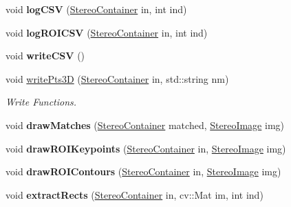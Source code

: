 \begin{DoxyCompactItemize}
\item 
void {\bfseries log\+C\+SV} (\hyperlink{structStereoContainer}{Stereo\+Container} in, int ind)\hypertarget{classStereoOps_a4af634e833f131f0416cb4e4b1c63b5c}{}\label{classStereoOps_a4af634e833f131f0416cb4e4b1c63b5c}

\item 
void {\bfseries log\+R\+O\+I\+C\+SV} (\hyperlink{structStereoContainer}{Stereo\+Container} in, int ind)\hypertarget{classStereoOps_a45ca1bf3096dfecb1b5cc41b7ddc69ca}{}\label{classStereoOps_a45ca1bf3096dfecb1b5cc41b7ddc69ca}

\item 
void {\bfseries write\+C\+SV} ()\hypertarget{classStereoOps_ae6bc70c116ecf440ba0796fdb999cd87}{}\label{classStereoOps_ae6bc70c116ecf440ba0796fdb999cd87}

\item 
void \hyperlink{classStereoOps_a8631d41ba48d3e808010643d6cb74f57}{write\+Pts3D} (\hyperlink{structStereoContainer}{Stereo\+Container} in, std\+::string nm)\hypertarget{classStereoOps_a8631d41ba48d3e808010643d6cb74f57}{}\label{classStereoOps_a8631d41ba48d3e808010643d6cb74f57}

\begin{DoxyCompactList}\small\item\em Write Functions. \end{DoxyCompactList}\item 
void {\bfseries draw\+Matches} (\hyperlink{structStereoContainer}{Stereo\+Container} matched, \hyperlink{classStereoImage}{Stereo\+Image} img)\hypertarget{classStereoOps_a31d9bd2f1aff9bee13ae6743e7aafcf0}{}\label{classStereoOps_a31d9bd2f1aff9bee13ae6743e7aafcf0}

\item 
void {\bfseries draw\+R\+O\+I\+Keypoints} (\hyperlink{structStereoContainer}{Stereo\+Container} in, \hyperlink{classStereoImage}{Stereo\+Image} img)\hypertarget{classStereoOps_a900fdbfa7de56f841a71444bc898dcef}{}\label{classStereoOps_a900fdbfa7de56f841a71444bc898dcef}

\item 
void {\bfseries draw\+R\+O\+I\+Contours} (\hyperlink{structStereoContainer}{Stereo\+Container} in, \hyperlink{classStereoImage}{Stereo\+Image} img)\hypertarget{classStereoOps_a7e72b90f908fb84b8d4b374e8b71ba79}{}\label{classStereoOps_a7e72b90f908fb84b8d4b374e8b71ba79}

\item 
void {\bfseries extract\+Rects} (\hyperlink{structStereoContainer}{Stereo\+Container} in, cv\+::\+Mat im, int ind)\hypertarget{classStereoOps_ac31df8f41540903f82561fd2829c7ab2}{}\label{classStereoOps_ac31df8f41540903f82561fd2829c7ab2}


\end{DoxyCompactItemize}
